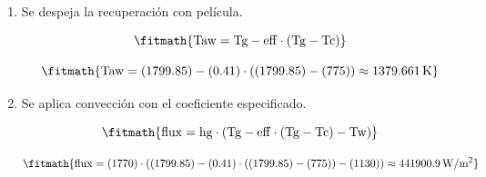 \begin{enumerate}

\item Se despeja la recuperación con película.

\[\fitmath{\mathrm{Taw}=\mathrm{Tg}-\mathrm{eff}\cdot \left(\mathrm{Tg}-\mathrm{Tc}\right)}\]

\[\fitmath{\mathrm{Taw}=(1799.85)-(0.41)\cdot \left((1799.85)-(775)\right)\approx 1379.661\,\mathrm{K}}\]

\item Se aplica convección con el coeficiente especificado.

\[\fitmath{\mathrm{flux}=\mathrm{hg}\cdot \left(\mathrm{Tg}-\mathrm{eff}\cdot \left(\mathrm{Tg}-\mathrm{Tc}\right)-\mathrm{Tw}\right)}\]

\[\fitmath{\mathrm{flux}=(1770)\cdot \left((1799.85)-(0.41)\cdot \left((1799.85)-(775)\right)-(1130)\right)\approx 441900.9\,\mathrm{W/m^{2}}}\]

\end{enumerate}
